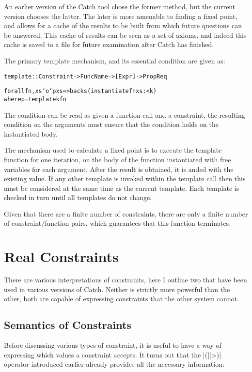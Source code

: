 \documentclass[preprint]{sigplanconf}
\newenvironment{code}{\begin{alltt}\small}{\end{alltt}}
\begin{document}
An earlier version of the Catch tool chose the former method, but the current version chooses the latter. The later is more amenable to finding a fixed point, and allows for a cache of the results to be built from which future questions can be answered. This cache of results can be seen as a set of axioms, and indeed this cache is saved to a file for future examination after Catch has finished.

The primary template mechanism, and its essential condition are given as:

\begin{code}
template :: Constraint -> FuncName -> [Expr] -> Prop Req

forall fn, xs `o` p xs => backs (instantiate fn xs :< k)
    where p = template k fn
\end{code}

The condition can be read as given a function call and a constraint, the resulting condition on the arguments must ensure that the condition holds on the instantiated body.

The mechanism used to calculate a fixed point is to execute the template function for one iteration, on the body of the function instantiated with free variables for each argument. After the result is obtained, it is anded with the existing value. If any other template is invoked within the template call then this must be considered at the same time as the current template. Each template is checked in turn until all templates do not change.

Given that there are a finite number of constraints, there are only a finite number of constraint/function pairs, which guarantees that this function terminates.

\section{Real Constraints}
\label{sec:constraint}

There are various interpretations of constraints, here I outline two that have been used in various versions of Catch. Neither is strictly more powerful than the other, both are capable of expressing constraints that the other system cannot.

\subsection{Semantics of Constraints}

Before discussing various types of constraint, it is useful to have a way of expressing which values a constraint accepts. It turns out that the |(||>)| operator introduced earlier already provides all the necessary information:
\end{document}
